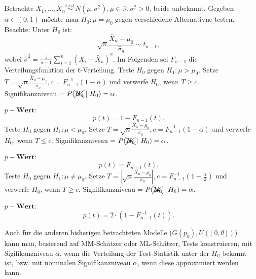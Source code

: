 \documentclass[10pt]{article}
\newcommand{\FZV}{X_1, \ldots, X_n} %
\newcommand{\IR}{\mathbb{R}} %
\newenvironment{BSP}[1][]
{\begin{Beispiel}[frametitle=#1]}{\end{Beispiel}}
\begin{document}
	\begin{BSP}[Beispiel 2.0.4 (Der t-Test)]
		Betrachte $\FZV \overset{i.i.d.}{\sim} N(\mu, \sigma^2), \mu \in \IR, \sigma^2 > 0$, beide unbekannt. 
		Gegeben $\alpha \in (0,1)$ möchte man $H_0: \mu = \mu_0$ gegen verschiedene Alternativne testen.
		Beachte: Unter $H_0$ ist:
		\begin{equation*}
			\sqrt{n} \frac{\bar{X}_n - \mu_0}{\hat{\sigma}_n} \sim t_{n-1},
		\end{equation*}
		wobei $\hat{\sigma}^2 = \frac{1}{n-1} \sum_{i=1}^{n} (X_i - \bar{X}_n)^2$. Im Folgenden sei $F_{n-1}$ die Verteilungsfunktion der t-Verteilung.
		Teste $H_0$ gegen $H_1: \mu > \mu_0$.
		Setze $T=\sqrt{n} \frac{\bar{X}_n - \mu_0}{\hat{\sigma}_n}, c = F^{-1}_{n-1}(1-\alpha)$ und verwerfe $H_0$, wenn $T\geq c$. Signifikanzniveau = $P(\xcancel{H_0} \mid H_0) = \alpha$.
		
		$p-\textbf{Wert}$:
		\begin{equation*}
			p(t)= 1- F_{n-1}(t).
		\end{equation*}
		Teste $H_0$ gegen $H_1: \mu < \mu_0$.
		Setze $T=\sqrt{n} \frac{\bar{X}_n - \mu_0}{\hat{\sigma}_n}, c = F^{-1}_{n-1}(1-\alpha)$ und verwerfe $H_0$, wenn $T\leq c$. Signifikanzniveau = $P(\xcancel{H_0} \mid H_0) = \alpha$.
		
		$p-\textbf{Wert}$:
		\begin{equation*}
			p(t)= F_{n-1}(t).
		\end{equation*}
		Teste $H_0$ gegen $H_1: \mu \neq \mu_0$.
		Setze $T=\left\vert\sqrt{n} \frac{\bar{X}_n - \mu_0}{\hat{\sigma}_n} \right\vert, c = F^{-1}_{n-1}\left(1-\frac{\alpha}{2}\right)$ und verwerfe $H_0$, wenn $T\geq c$. Signifikanzniveau = $P(\xcancel{H_0} \mid H_0) = \alpha$.
		
		$p-\textbf{Wert}$:
		\begin{equation*}
			p(t)= 2\cdot (1- F^{-1}_{n-1}(t)).
		\end{equation*}
	\end{BSP}
	
	\begin{Bemerkung}
		Auch für die anderen bisherigen betrachteten Modelle ($G(p_0), U([0, \theta])$) kann man, basierend auf MM-Schätzer oder ML-Schätzer, Tests konstruieren, mit Sigifikanzniveau $\alpha$, wenn die Verteilung der Test-Statistik unter der $H_0$ bekannt ist, bzw. mit nominalen Signifikanzniveau $\alpha$, wenn diese approximiert werden kann.
	\end{Bemerkung}
	
\end{document}
